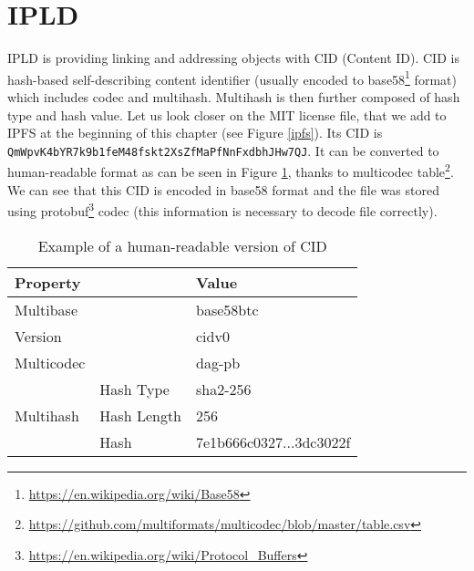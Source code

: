 


\section{IPLD}
IPLD is providing linking and addressing objects with CID (Content ID). CID is hash-based self-describing content identifier (usually encoded to base58\footnote{\url{https://en.wikipedia.org/wiki/Base58}} format) which includes codec and multihash. Multihash is then further composed of hash type and hash value. Let us look closer on the MIT license file, that we add to IPFS at the beginning of this chapter (see Figure \ref{ipfs}). Its CID is \texttt{QmWpvK4bYR7k9b1feM48fsk\-t2XsZfMaPfNnFxdbhJHw7QJ}. It can be converted to human-readable format as can be seen in Figure \ref{tab:CIDexample}, thanks to multicodec table\footnote{\url{https://github.com/multiformats/multicodec/blob/master/table.csv}}. We can see that this CID is encoded in base58 format and the file was stored using protobuf\footnote{\url{https://en.wikipedia.org/wiki/Protocol\_Buffers}} codec (this information is necessary to decode file correctly).



\begin{table}[]
    \centering
    \begin{tabular}{|ll|l|}
    \hline
    \textbf{Property}                  &             & \textbf{Value}                                                            \\ \hline
    Multibase                                        &             & base58btc                                                        \\ \hline
    Version                                          &             & cidv0                                                            \\ \hline
    Multicodec                                       &             & dag-pb                                                           \\ \hline
    \multicolumn{1}{|l|}{\multirow{3}{*}{Multihash}} & Hash Type   & sha2-256                                                         \\ \cline{2-3} 
    \multicolumn{1}{|l|}{}                           & Hash Length & 256                                                              \\ \cline{2-3} 
    \multicolumn{1}{|l|}{}                           & Hash        & 7e1b666c0327...3dc3022f \\ \hline
    \end{tabular}
    \caption{Example of a human-readable version of CID}
    \label{tab:CIDexample}
\end{table}


